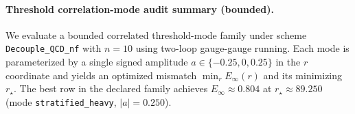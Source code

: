 \paragraph{Threshold correlation-mode audit summary (bounded).}
\AuditTag We evaluate a bounded correlated threshold-mode family under scheme \texttt{Decouple\_QCD\_nf} with $n=10$ using two-loop gauge-gauge running. Each mode is parameterized by a single signed amplitude $a\in\{-0.25,0,0.25\}$ in the $r$ coordinate and yields an optimized mismatch $\min_r E_\infty(r)$ and its minimizing $r_\star$. The best row in the declared family achieves $E_\infty\approx 0.804$ at $r_\star\approx 89.250$ (mode \texttt{stratified\_heavy}, $|a|=0.250$).
